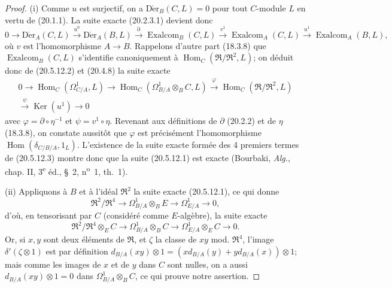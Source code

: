 \begin{proof}
(i) Comme $u$ est surjectif, on a $\operatorname{D\acute{e}r}_B(C,L)=0$ pour tout $C$-module
$L$ en vertu de (20.1.1). La suite exacte (20.2.3.1) devient donc
\begin{equation}
\tag{20.5.12.2}
\label{0.20.5.12.2-fr}
  0\longrightarrow\operatorname{D\acute{e}r}_A(C,L)\xrightarrow{u^0}\operatorname{D\acute{e}r}_A(B,L)
  \xrightarrow{\partial}\operatorname{Exalcom}_B(C,L)
  \xrightarrow{v^1}\operatorname{Exalcom}_A(C,L)
  \xrightarrow{u^1}\operatorname{Exalcom}_A(B,L),
\end{equation}
où $v$ est l'homomorphisme $A\to B$. Rappelons d'autre part (18.3.8) que
$\operatorname{Exalcom}_B(C,L)$ s'identifie canoniquement à
$\operatorname{Hom}_C(\mathfrak{R}/\mathfrak{R}^2,L)$; on déduit donc de (20.5.12.2)
et (20.4.8) la suite exacte
\begin{equation}
\tag{20.5.12.3}
\label{0.20.5.12.3-fr}
\begin{split}
  0\longrightarrow\operatorname{Hom}_C(\Omega^1_{C/A},L)
  \longrightarrow\operatorname{Hom}_C(\Omega^1_{B/A}\otimes_B C,L)
  \xrightarrow{\varphi}\operatorname{Hom}_C(\mathfrak{R}/\mathfrak{R}^2,L)\\
  \xrightarrow{\psi}\operatorname{Ker}(u^1)\longrightarrow 0
\end{split}
\end{equation}
avec $\varphi=\partial\circ\eta^{-1}$ et $\psi=v^1\circ\eta$. Revenant
aux définitions de $\partial$ (20.2.2) et de $\eta$ (18.3.8), on constate
aussitôt que $\varphi$ est précisément l'homomorphisme
$\operatorname{Hom}(\delta_{C/B/A},1_L)$. L'existence de la suite exacte formée des
4 premiers termes de (20.5.12.3) montre donc que la suite (20.5.12.1)
est exacte (Bourbaki, \emph{Alg.}, chap. II, 3\textsuperscript{e} éd.,
\S~2, n\textsuperscript{o}~1, th.~1).

\medskip
(ii) Appliquons à $B$ et à l'idéal $\mathfrak{R}^2$ la suite exacte
(20.5.12.1), ce qui donne
\begin{equation}
\tag{20.5.12.4}
\label{0.20.5.12.4-fr}
  \mathfrak{R}^2/\mathfrak{R}^4\longrightarrow
  \Omega^1_{B/A}\otimes_B E\longrightarrow\Omega^1_{E/A}\longrightarrow 0,
\end{equation}
d'où, en tensorisant par $C$ (considéré comme $E$-algèbre), la suite
exacte
\[
  \mathfrak{R}^2/\mathfrak{R}^4\otimes_E C\longrightarrow
  \Omega^1_{B/A}\otimes_B C\longrightarrow
  \Omega^1_{E/A}\otimes_E C\longrightarrow 0.
\]
Or, si $x,y$ sont deux éléments de $\mathfrak{R}$, et $\zeta$ la classe
de $xy$ mod. $\mathfrak{R}^4$, l'image
$\delta'(\zeta\otimes1)$ est par définition
$d_{B/A}(xy)\otimes1=(xd_{B/A}(y)+yd_{B/A}(x))\otimes1$; mais comme les
images de $x$ et de $y$ dans $C$ sont nulles, on a aussi
$d_{B/A}(xy)\otimes1=0$ dans $\Omega^1_{B/A}\otimes_B C$, ce qui prouve
notre assertion.


\end{proof}
